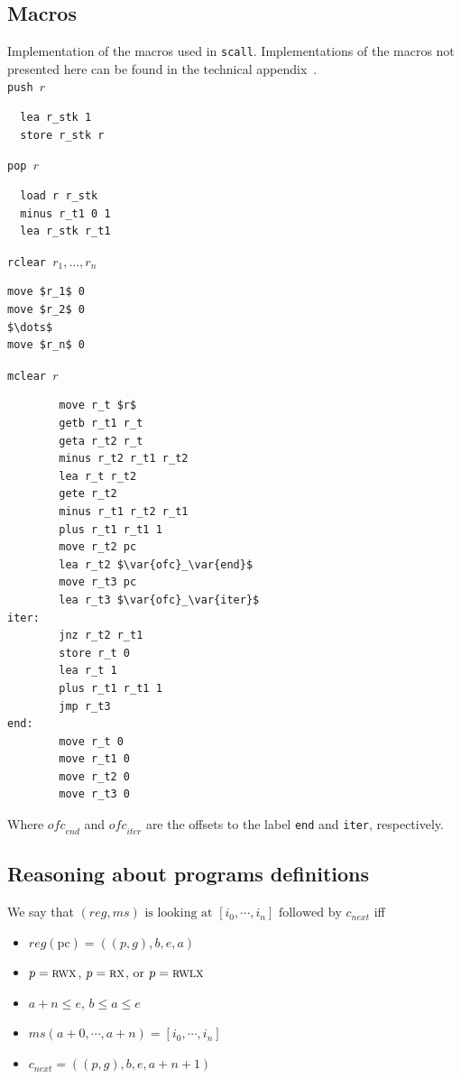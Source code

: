 \documentclass[format=acmsmall, review=true, screen=true]{acmart}
\newcommand{\var}[1]{\mathit{#1}}
\newcommand{\hs}{\var{ms}}
\newcommand{\ms}{\hs}
\newcommand{\pcreg}{\mathrm{pc}}
\newcommand{\reg}{\var{reg}}
\newcommand{\plainperm}[1]{\textsc{#1}}
\newcommand{\exec}{\plainperm{rx}}
\newcommand{\rwx}{\plainperm{rwx}}
\newcommand{\rwlx}{\plainperm{rwlx}}
\begin{document}
\subsection{Macros}
Implementation of the macros used in \texttt{scall}. Implementations of the
macros not presented here can be found in the technical
appendix~\citep{technical_appendix}.\\
\label{app:macros}
\texttt{push $r$}
\begin{lstlisting}
  lea r_stk 1
  store r_stk r
\end{lstlisting}
\texttt{pop $r$}
\begin{lstlisting}
  load r r_stk
  minus r_t1 0 1
  lea r_stk r_t1
\end{lstlisting}
\texttt{rclear $r_1,\dots, r_n$}
\begin{lstlisting}
move $r_1$ 0
move $r_2$ 0
$\dots$
move $r_n$ 0
\end{lstlisting}
\texttt{mclear $r$}
\begin{lstlisting}
        move r_t $r$
        getb r_t1 r_t
        geta r_t2 r_t
        minus r_t2 r_t1 r_t2
        lea r_t r_t2
        gete r_t2
        minus r_t1 r_t2 r_t1
        plus r_t1 r_t1 1
        move r_t2 pc
        lea r_t2 $\var{ofc}_\var{end}$ 
        move r_t3 pc
        lea r_t3 $\var{ofc}_\var{iter}$
iter:
        jnz r_t2 r_t1
        store r_t 0
        lea r_t 1
        plus r_t1 r_t1 1
        jmp r_t3
end:
        move r_t 0
        move r_t1 0
        move r_t2 0
        move r_t3 0
\end{lstlisting}
Where $\var{ofc}_\var{end}$ and $\var{ofc}_\var{iter}$ are the offsets to the
label \texttt{end} %
and \texttt{iter}, %
respectively.

\subsection{Reasoning about programs definitions}
\begin{definition}
  We say that $(\reg,\ms) \text{ is looking at } [i_0,\cdots,i_n] \text{ followed by } c_{\mathit{next}}$ 
  iff
  \begin{itemize}
  \item $\reg(\pcreg) = ((p,g),b,e,a)$
  \item $p = \rwx$, $p = \exec$, or $p = \rwlx$
  \item $a+n\leq e$, $b\leq a\leq e$
  \item $\ms(a+0,\cdots,a+n) = [i_0,\cdots,i_n]$
  \item $c_{\mathit{next}} = ((p,g),b,e,a+n+1)$
  \end{itemize}
\end{definition}
\end{document}
